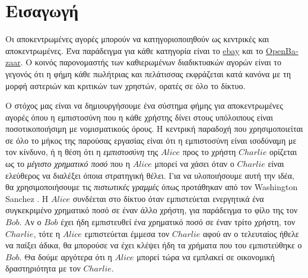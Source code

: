 \section{Εισαγωγή}
  Οι αποκεντρωμένες αγορές μπορούν να κατηγοριοποιηθούν ως κεντρικές και αποκεντρωμένες. Ένα παράδειγμα για κάθε κατηγορία
  είναι το \href{http://www.ebay.com}{\textlatin{ebay}} και το \href{https://openbazaar.org/}{\textlatin{OpenBazaar}}. Ο
  κοινός παρονομαστής των καθιερωμένων διαδικτυακών αγορών είναι το γεγονός ότι η φήμη κάθε πωλήτριας και πελάτισσας
  εκφράζεται κατά κανόνα με τη μορφή αστεριών και κριτικών των χρηστών, ορατές σε όλο το δίκτυο.

  Ο στόχος μας είναι να δημιουργήσουμε ένα σύστημα φήμης για αποκεντρωμένες αγορές όπου η εμπιστοσύνη που η κάθε χρήστης δίνει
  στους υπόλοιπους είναι ποσοτικοποιήσιμη με νομισματικούς όρους. Η κεντρική παραδοχή που χρησιμοποιείται σε όλο το μήκος της
  παρούσας εργασίας είναι ότι η εμπιστοσύνη είναι ισοδύναμη με τον κίνδυνο, ή η θέση ότι η \textit{εμπιστοσύνη} της $Alice$
  προς το χρήστη $Charlie$ ορίζεται ως το \textit{μέγιστο χρηματικό ποσό} που η $Alice$ μπορεί να χάσει όταν ο $Charlie$ είναι
  ελεύθερος να διαλέξει όποια στρατηγική θέλει. Για να υλοποιήσουμε αυτή την ιδέα, θα χρησιμοποιήσουμε τις \textit{πιστωτικές
  γραμμές} όπως προτάθηκαν από τον \textlatin{Washington Sanchez} \cite{loc}. Η $Alice$ συνδέεται στο δίκτυο όταν εμπιστεύεται
  ενεργητικά ένα συγκεκριμένο χρηματικό ποσό σε έναν άλλο χρήστη, για παράδειγμα το φίλο της τον $Bob$. Αν ο $Bob$ έχει ήδη
  εμπιστευθεί ένα χρηματικό ποσό σε έναν τρίτο χρήστη, τον $Charlie$, τότε η $Alice$ εμπιστεύεται έμμεσα τον $Charlie$ αφού αν
  ο τελευταίος ήθελε να παίξει άδικα, θα μπορούσε να έχει κλέψει ήδη τα χρήματα που του εμπιστεύθηκε ο $Bob$. Θα δούμε
  αργότερα ότι η $Alice$ μπορεί τώρα να εμπλακεί σε οικονομική δραστηριότητα με τον $Charlie$.

